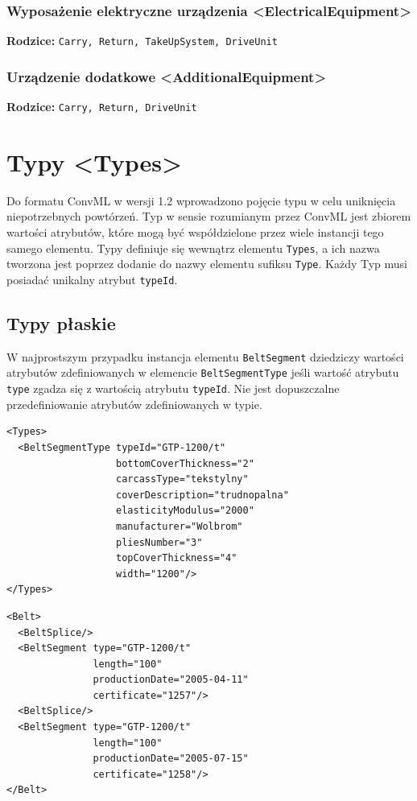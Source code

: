 \documentclass[12pt,a4paper]{article}
\begin{document}
\subsubsection{Wyposażenie elektryczne urządzenia <ElectricalEquipment>}
\noindent\textbf{Rodzice:} \texttt{Carry, Return, TakeUpSystem, DriveUnit}


\subsubsection{Urządzenie dodatkowe <AdditionalEquipment>}
\noindent\textbf{Rodzice:} \texttt{Carry, Return, DriveUnit}


\section{Typy <Types>}\label{sec:Types}
Do formatu ConvML w wersji 1.2 wprowadzono pojęcie typu w celu uniknięcia
niepotrzebnych powtórzeń.  Typ w sensie rozumianym przez ConvML jest zbiorem
wartości atrybutów, które mogą być współdzielone przez wiele instancji tego
samego elementu.  Typy definiuje się wewnątrz elementu {\tt Types}, a ich nazwa
tworzona jest poprzez dodanie do nazwy elementu sufiksu {\tt Type}. Każdy Typ
musi posiadać unikalny atrybut {\tt typeId}.


\subsection{Typy płaskie}
W najprostszym przypadku instancja elementu {\tt BeltSegment} dziedziczy
wartości atrybutów zdefiniowanych w elemencie {\tt BeltSegmentType} jeśli
wartość atrybutu {\tt type} zgadza się z wartością atrybutu {\tt typeId}.  Nie
jest dopuszczalne przedefiniowanie atrybutów zdefiniowanych w typie.

\begin{verbatim}
<Types>
  <BeltSegmentType typeId="GTP-1200/t"
                   bottomCoverThickness="2"
                   carcassType="tekstylny"
                   coverDescription="trudnopalna"
                   elasticityModulus="2000"
                   manufacturer="Wolbrom"
                   pliesNumber="3"
                   topCoverThickness="4"
                   width="1200"/>
</Types>
\end{verbatim}

\begin{verbatim}
<Belt>
  <BeltSplice/>
  <BeltSegment type="GTP-1200/t"
               length="100"
               productionDate="2005-04-11"
               certificate="1257"/>
  <BeltSplice/>
  <BeltSegment type="GTP-1200/t"
               length="100"
               productionDate="2005-07-15"
               certificate="1258"/>
</Belt>
\end{verbatim}
\end{document}
